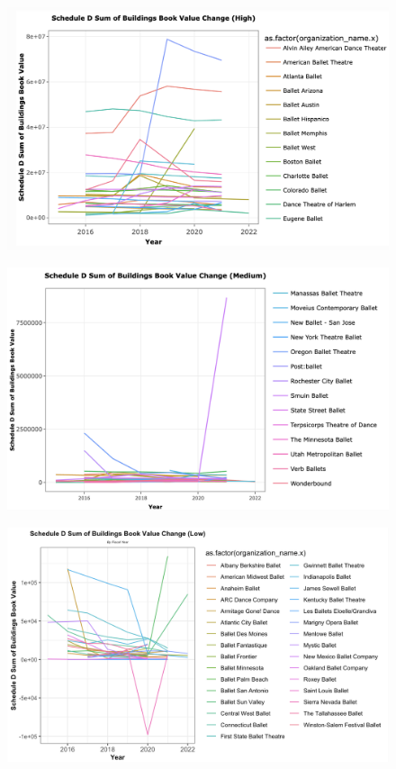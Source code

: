 \documentclass[Dance Data
Project,article,submit,moreauthors,pdftex]{mdpi}
\begin{document}
\begin{figure}[H]
\includegraphics[width=0.8\linewidth,]{../images/high} \caption{\label{fig:high}}\label{fig:unnamed-chunk-19}
\end{figure}

\begin{figure}[H]
\includegraphics[width=0.8\linewidth,]{../images/medium} \caption{\label{fig:medium}}\label{fig:unnamed-chunk-20}
\end{figure}

\begin{figure}[H]
\includegraphics[width=0.8\linewidth,]{../images/low} \caption{\label{fig:low}}\label{fig:unnamed-chunk-21}
\end{figure}
\end{document}
